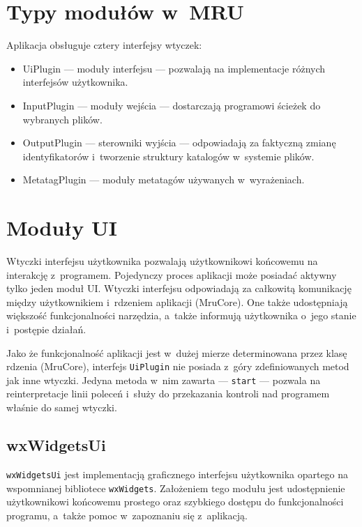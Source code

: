 \section{Typy modułów w~MRU}
\label{moduly}
Aplikacja obsługuje cztery interfejsy wtyczek:
\begin{itemize}
\item UiPlugin --- moduły interfejsu --- pozwalają na implementacje różnych interfejsów użytkownika.
\item InputPlugin --- moduły wejścia --- dostarczają programowi ścieżek do wybranych plików.
\item OutputPlugin --- sterowniki wyjścia --- odpowiadają za faktyczną zmianę identyfikatorów i~tworzenie struktury katalogów w~systemie plików.
\item MetatagPlugin --- moduły metatagów używanych w~wyrażeniach.
\end{itemize}

\section{Moduły UI}
\par
Wtyczki interfejsu użytkownika pozwalają użytkownikowi końcowemu na interakcję z~programem.
Pojedynczy proces aplikacji może posiadać aktywny tylko jeden moduł UI. 
Wtyczki interfejsu odpowiadają za całkowitą komunikację między użytkownikiem i~rdzeniem aplikacji (MruCore). One także udostępniają większość funkcjonalności narzędzia, a~także informują użytkownika o~jego stanie i~postępie działań.
\par
Jako że funkcjonalność aplikacji jest w~dużej mierze determinowana przez klasę rdzenia (MruCore), interfejs \texttt{UiPlugin} nie posiada z~góry zdefiniowanych metod jak inne wtyczki. Jedyna metoda w~nim zawarta --- \texttt{start} --- pozwala na reinterpretacje linii poleceń i~służy do przekazania kontroli nad programem właśnie do samej wtyczki.

\subsection{wxWidgetsUi}
\par
\texttt{wxWidgetsUi} jest implementacją graficznego interfejsu użytkownika opartego na wspomnianej bibliotece \texttt{wxWidgets}. Założeniem tego modułu jest udostępnienie użytkownikowi końcowemu prostego oraz szybkiego dostępu do funkcjonalności programu, a~także pomoc w~zapoznaniu się z~aplikacją.

